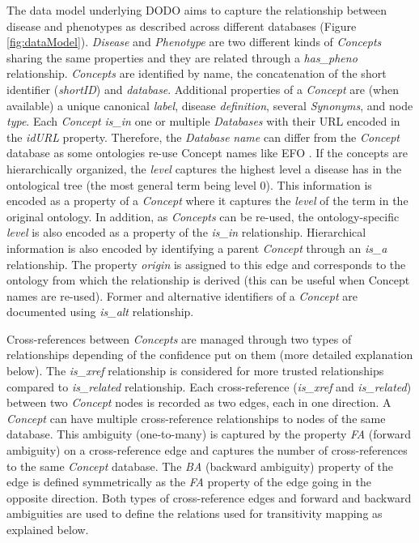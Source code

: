 \documentclass[9pt,a4paper,]{extarticle}
\begin{document}
The data model underlying DODO aims to capture the relationship between disease and phenotypes as described across different databases (Figure \ref{fig:dataModel}). \emph{Disease} and \emph{Phenotype} are two different kinds of \emph{Concepts} sharing the same properties and they are related through a \emph{has\_pheno} relationship. \emph{Concepts} are identified by name, the concatenation of the short identifier (\emph{shortID}) and \emph{database}. Additional properties of a \emph{Concept} are (when available) a unique canonical \emph{label}, disease \emph{definition}, several \emph{Synonyms}, and node \emph{type}. Each \emph{Concept} \emph{is\_in} one or multiple \emph{Databases} with their URL encoded in the \emph{idURL} property. Therefore, the \emph{Database} \emph{name} can differ from the \emph{Concept} database as some ontologies re-use Concept names like EFO \citep{Malone2010}. If the concepts are hierarchically organized, the \emph{level} captures the highest level a disease has in the ontological tree (the most general term being level 0). This information is encoded as a property of a \emph{Concept} where it captures the \emph{level} of the term in the original ontology. In addition, as \emph{Concepts} can be re-used, the ontology-specific \emph{level} is also encoded as a property of the \emph{is\_in} relationship. Hierarchical information is also encoded by identifying a parent \emph{Concept} through an \emph{is\_a} relationship. The property \emph{origin} is assigned to this edge and corresponds to the ontology from which the relationship is derived (this can be useful when Concept names are re-used). Former and alternative identifiers of a \emph{Concept} are documented using \emph{is\_alt} relationship.

Cross-references between \emph{Concepts} are managed through two types of relationships depending of the confidence put on them (more detailed explanation below). The \emph{is\_xref} relationship is considered for more trusted relationships compared to \emph{is\_related} relationship. Each cross-reference (\emph{is\_xref} and \emph{is\_related}) between two \emph{Concept} nodes is recorded as two edges, each in one direction. A \emph{Concept} can have multiple cross-reference relationships to nodes of the same database. This ambiguity (one-to-many) is captured by the property \emph{FA} (forward ambiguity) on a cross-reference edge and captures the number of cross-references to the same \emph{Concept} database. The \emph{BA} (backward ambiguity) property of the edge is defined symmetrically as the \emph{FA} property of the edge going in the opposite direction. Both types of cross-reference edges and forward and backward ambiguities are used to define the relations used for transitivity mapping as explained below.
\end{document}
